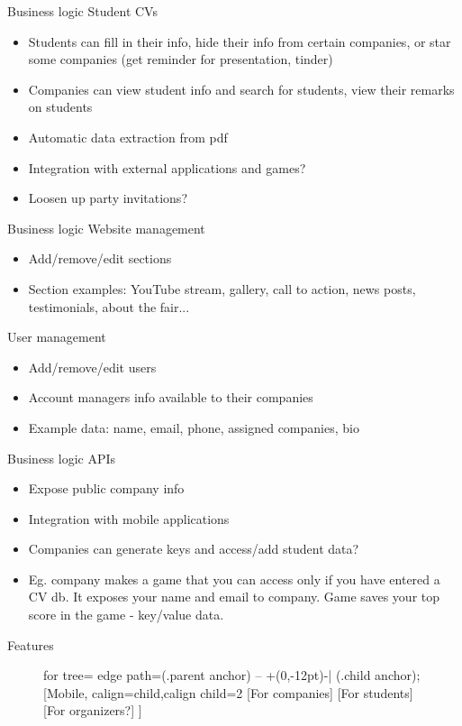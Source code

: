 \documentclass{beamer}
\begin{document}
	\begin{frame}{Business logic}
		Student CVs
		\begin{itemize}
			\item Students can fill in their info, hide their info from certain companies, or star some companies (get reminder for presentation, tinder)
			\item Companies can view student info and search for students, view their remarks on students
			\item Automatic data extraction from pdf
			\item Integration with external applications and games?
			\item Loosen up party invitations?
		\end{itemize}
	\end{frame}

	\begin{frame}{Business logic}
		Website management
		\begin{itemize}
			\item Add/remove/edit sections
			\item Section examples: YouTube stream, gallery, call to action, news posts, testimonials, about the fair...
		\end{itemize}
		User management
		\begin{itemize}
			\item Add/remove/edit users
			\item Account managers info available to their companies
			\item Example data: name, email, phone, assigned companies, bio
		\end{itemize}
	\end{frame}

	\begin{frame}{Business logic}
		APIs
		\begin{itemize}
			\item Expose public company info
			\item Integration with mobile applications
			\item Companies can generate keys and access/add student data?
			\item Eg. company makes a game that you can access only if you have entered a CV db. It exposes your name and email to company. Game saves your top score in the game - key/value data. 
		\end{itemize}
	\end{frame}

	\begin{frame}{Features}
		\begin{figure}
			\begin{forest}
				for tree={%
					edge path={\noexpand{} (.parent anchor) -- +(0,-12pt)-| (.child anchor);}
				}
				[Mobile, calign=child,calign child=2
					[For companies]
					[For students]
					[For organizers?]
				]
			\end{forest}
		\end{figure}
	\end{frame}
	
\end{document}
